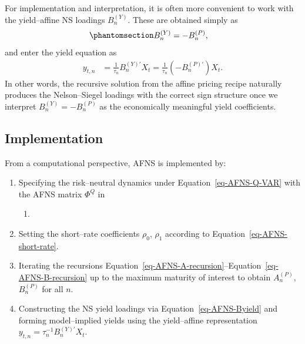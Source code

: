 \documentclass[
  letterpaper,
  DIV=11,
  numbers=noendperiod]{scrreprt}
\providecommand{\tightlist}{%
  \setlength{\itemsep}{0pt}\setlength{\parskip}{0pt}}
\begin{document}
For implementation and interpretation, it is often more convenient to
work with the yield--affine NS loadings \(B_n^{(Y)}\). These are
obtained simply as
\begin{equation}\protect\phantomsection\label{eq-AFNS-Byield}{
\begin{align}
B_n^{(Y)} &= - B_n^{(P)},
\end{align}
}\end{equation} and enter the yield equation as
\begin{align}
y_{t,n}
&= \frac{1}{\tau_n} B_n^{(Y)\prime} X_t
= \frac{1}{\tau_n} \left(- B_n^{(P)\prime}\right) X_t.
\end{align}
In other words, the recursive solution from the affine pricing recipe
naturally produces the Nelson--Siegel loadings with the correct sign
structure once we interpret \(B_n^{(Y)} = - B_n^{(P)}\) as the
economically meaningful yield coefficients.

\subsection*{Implementation}\label{implementation}

From a computational perspective, AFNS is implemented by:

\begin{enumerate}
\def\labelenumi{\arabic{enumi}.}
\item
  Specifying the risk--neutral dynamics under
  Equation~\ref{eq-AFNS-Q-VAR} with the AFNS matrix \(\Phi^Q\) in

  \begin{enumerate}
  \def\labelenumii{\arabic{enumii}.}
  \tightlist
  \item
  \end{enumerate}
\item
  Setting the short--rate coefficients \(\rho_0\), \(\rho_1\) according
  to Equation~\ref{eq-AFNS-short-rate}.
\item
  Iterating the recursions
  Equation~\ref{eq-AFNS-A-recursion}--Equation~\ref{eq-AFNS-B-recursion}
  up to the maximum maturity of interest to obtain \(A_n^{(P)}\),
  \(B_n^{(P)}\) for all \(n\).
\item
  Constructing the NS yield loadings via Equation~\ref{eq-AFNS-Byield}
  and forming model--implied yields using the yield--affine
  representation \(y_{t,n} = \tau_n^{-1} B_n^{(Y)\prime} X_t\).
\end{enumerate}
\end{document}
